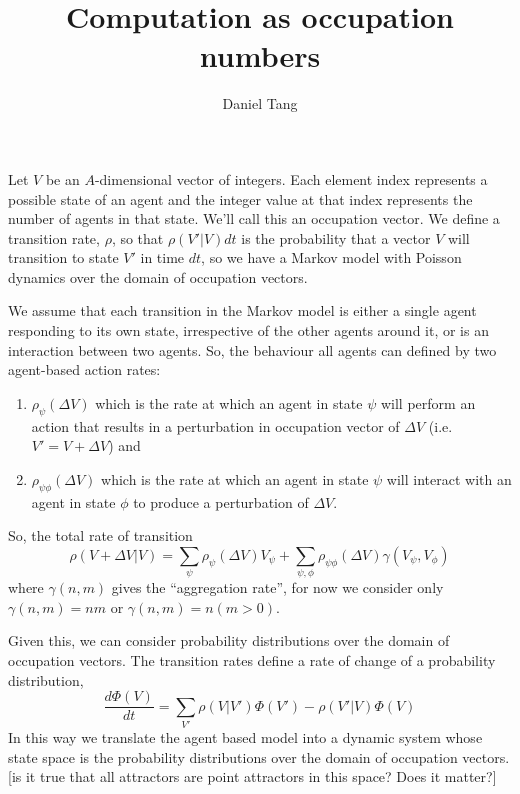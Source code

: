 \documentclass[a4paper]{article}
\title{Computation as occupation numbers}
\author{Daniel Tang}
\begin{document}
\maketitle

Let $V$ be an $A$-dimensional vector of integers. Each element index represents a possible state of an agent and the integer value at that index represents the number of agents in that state. We'll call this an occupation vector. We define a transition rate, $\rho$, so that $\rho(V'|V)dt$ is the probability that a vector $V$ will transition to state $V'$ in time $dt$, so we have a Markov model with Poisson dynamics over the domain of occupation vectors.

We assume that each transition in the Markov model is either a single agent responding to its own state, irrespective of the other agents around it, or is an interaction between two agents. So, the behaviour all agents can defined by two agent-based action rates:
\begin{enumerate}
	\item $\rho_\psi(\Delta V)$ which is the rate at which an agent in state $\psi$ will perform an action that results in a perturbation in occupation vector of $\Delta V$ (i.e. $V' = V + \Delta V$) and
	\item $\rho_{\psi\phi}(\Delta V)$ which is the rate at which an agent in state $\psi$ will interact with an agent in state $\phi$ to produce a perturbation of $\Delta V$. 
\end{enumerate}

So, the total rate of transition 
\begin{equation}
\rho(V + \Delta V|V) = \sum_{\psi}  \rho_\psi(\Delta V) V_\psi + \sum_{\psi,\phi}  \rho_{\psi\phi}(\Delta V) \gamma(V_\psi,V_\phi)
\label{rateEq}
\end{equation}
where $\gamma(n,m)$ gives the ``aggregation rate'', for now we consider only $\gamma(n,m) = nm$ or $\gamma(n,m) = n(m>0)$.

Given this, we can consider probability distributions over the domain of occupation vectors. The transition rates define a rate of change of a probability distribution,
\begin{equation}
\frac{d\Phi(V)}{dt} = \sum_{V'} \rho(V|V')\Phi(V') - \rho(V'|V)\Phi(V)
\label{changeEq}
\end{equation}
In this way we translate the agent based model into a dynamic system whose state space is the probability distributions over the domain of occupation vectors. [is it true that all attractors are point attractors in this space? Does it matter?]
\end{document}
